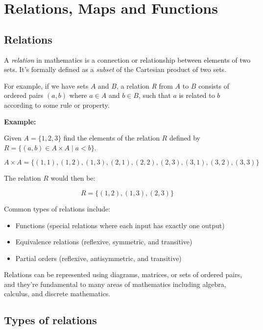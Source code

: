 \newpage
\section{Relations, Maps and Functions}

\subsection{Relations}

A \emph{relation} in mathematics is a connection or relationship between elements of two sets. It's 
formally defined as a \emph{subset} of the Cartesian product of two sets.

For example, if we have sets \(A\) and \(B\), a relation \emph{R} from \(A\) to \(B\) consists
of ordered pairs \((a,b)\) where \(a \in A\) and \(b \in B\), such that \(a\) is related to \(b\) 
according to some rule or property.

\textbf{Example:} 

Given \(A = \{1,2,3\}\) find the elements of the relation \(R\) defined by \(R = \{(a, b) \in A \times A \mid a < b\}\).

\[
	A \times A = \{(1,1), (1,2), (1,3), (2,1), (2,2), (2,3), (3,1), (3,2), (3,3)\}
\]

The relation \(R\) would then be:

\[
	R = \{(1,2), (1,3), (2,3)\}
\]

Common types of relations include:

\begin{itemize}

	\item Functions (special relations where each input has exactly one output)

	\item Equivalence relations (reflexive, symmetric, and transitive)

	\item Partial orders (reflexive, antisymmetric, and transitive)

\end{itemize}

Relations can be represented using diagrams, matrices, or sets of
ordered pairs, and they're fundamental to many areas of mathematics including algebra, calculus, and 
discrete mathematics.

\subsection{Types of relations}

